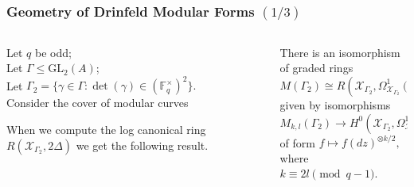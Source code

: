 \documentclass{beamer}
\numberwithin{equation}{section}
\numberwithin{case}{theorem}
\newcommand{\sX}{\mathscr{X}}		%
\newcommand{\bbF}{\mathbb{F}}		%
\newcommand{\GL}{\mathrm{GL}} 	%
\newcommand{\<}{\left\langle}
\renewcommand{\>}{\right\rangle}
\begin{document}
\begin{frame}
	\frametitle{Geometry of Drinfeld Modular Forms $(1/3)$}
	\begin{columns} 
		\begin{column}{.5\textwidth}
			Let $q$ be odd;\\
			Let $\Gamma\leq \GL_2(A)$;\\ 
			Let $\Gamma_2=\{\gamma\in \Gamma:\det(\gamma)\in (\bbF_q^{\times})^2\}.$ \pause\\
			Consider the cover of modular curves
			\begin{figure}[!h]\centering
			\end{figure}\pause
			When we compute the log canonical ring $R(\sX_{\Gamma_2}, 2\Delta)$ we get the following result.
		\end{column}\pause
		\begin{column}{.5\textwidth}
			\begin{theorem}
				There is an isomorphism of graded rings \[M(\Gamma_2)\cong R(\sX_{\Gamma_2},\Omega^1_{\sX_{\Gamma_2}}(2\Delta)),\]\pause
				given by isomorphisms \[M_{k,l}(\Gamma_2)\to H^0(\sX_{\Gamma_2},\Omega^1_{\sX_{\Gamma_2}}(2\Delta)^{\otimes k/2})\] of form $f\mapsto f(dz)^{\otimes k/2},$ \pause where \\$k\equiv 2l\pmod{q-1}.$ 
			\end{theorem}
		\end{column}
	\end{columns}
\end{frame}
\end{document}

